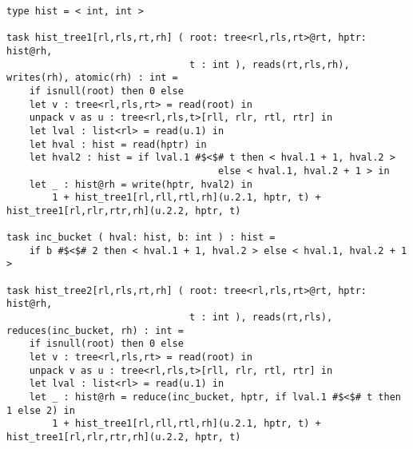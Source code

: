 \begin{lstlisting}[label={lst:histogram},caption={Histogram with Reductions and Atomic Coherence}]
type hist = < int, int >

task hist_tree1[rl,rls,rt,rh] ( root: tree<rl,rls,rt>@rt, hptr: hist@rh, 
                                t : int ), reads(rt,rls,rh), writes(rh), atomic(rh) : int =
    if isnull(root) then 0 else
    let v : tree<rl,rls,rt> = read(root) in
    unpack v as u : tree<rl,rls,t>[rll, rlr, rtl, rtr] in
    let lval : list<rl> = read(u.1) in
    let hval : hist = read(hptr) in
    let hval2 : hist = if lval.1 #$<$# t then < hval.1 + 1, hval.2 >
                                     else < hval.1, hval.2 + 1 > in
    let _ : hist@rh = write(hptr, hval2) in
        1 + hist_tree1[rl,rll,rtl,rh](u.2.1, hptr, t) + hist_tree1[rl,rlr,rtr,rh](u.2.2, hptr, t)

task inc_bucket ( hval: hist, b: int ) : hist =
    if b #$<$# 2 then < hval.1 + 1, hval.2 > else < hval.1, hval.2 + 1 >

task hist_tree2[rl,rls,rt,rh] ( root: tree<rl,rls,rt>@rt, hptr: hist@rh, 
                                t : int ), reads(rt,rls), reduces(inc_bucket, rh) : int =
    if isnull(root) then 0 else
    let v : tree<rl,rls,rt> = read(root) in
    unpack v as u : tree<rl,rls,t>[rll, rlr, rtl, rtr] in
    let lval : list<rl> = read(u.1) in
    let _ : hist@rh = reduce(inc_bucket, hptr, if lval.1 #$<$# t then 1 else 2) in
        1 + hist_tree1[rl,rll,rtl,rh](u.2.1, hptr, t) + hist_tree1[rl,rlr,rtr,rh](u.2.2, hptr, t)
\end{lstlisting}
